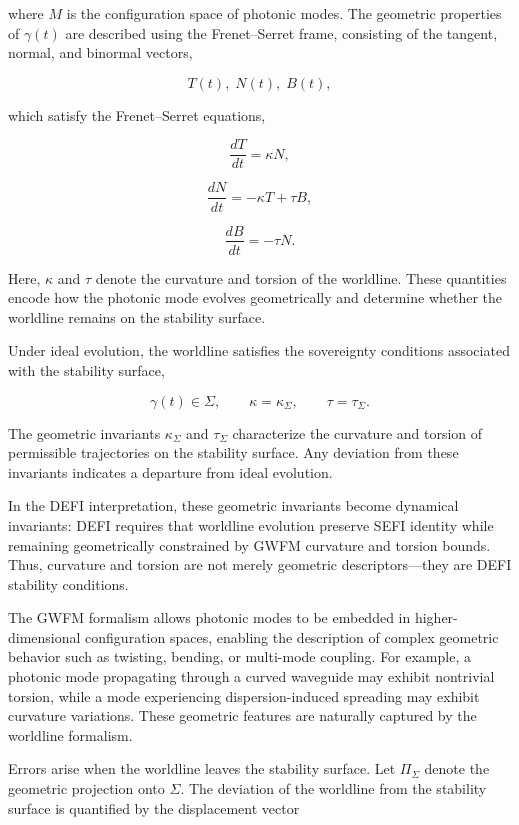 \documentclass[aip,adv,reprint,floatfix]{revtex4-2}
\begin{document}
where $M$ is the configuration space of photonic modes.
The geometric properties of $\gamma(t)$ are described using the
Frenet–Serret frame, consisting of the tangent, normal,
and binormal vectors,


\[
T(t),\; N(t),\; B(t),
\]


which satisfy the Frenet–Serret equations,\cite{DuttonElectronField2026}


\[
\frac{dT}{dt} = \kappa N,
\]




\[
\frac{dN}{dt} = -\kappa T + \tau B,
\]




\[
\frac{dB}{dt} = -\tau N.
\]


Here, $\kappa$ and $\tau$ denote the curvature and torsion of the
worldline. These quantities encode how the photonic
mode evolves geometrically and determine whether the
worldline remains on the stability surface.

Under ideal evolution, the worldline satisfies the
sovereignty conditions associated with the stability surface,


\[
\gamma(t) \in \Sigma,\qquad \kappa = \kappa_{\Sigma},\qquad \tau = \tau_{\Sigma}.
\]


The geometric invariants $\kappa_{\Sigma}$ and $\tau_{\Sigma}$ characterize the curvature and torsion of permissible trajectories on the stability surface. Any deviation from these invariants indicates a departure from ideal evolution.

In the DEFI interpretation, these geometric invariants
become dynamical invariants:\cite{DuttonSEFI2026} DEFI requires that worldline evolution preserve SEFI identity while remaining geometrically constrained by GWFM curvature and torsion
bounds. Thus, curvature and torsion are not merely geometric descriptors—they are DEFI stability conditions.

The GWFM formalism allows photonic modes to be
embedded in higher-dimensional configuration spaces,
enabling the description of complex geometric behavior
such as twisting, bending, or multi-mode coupling.\cite{DuttonElectronField2026}
For example, a photonic mode propagating through a curved
waveguide may exhibit nontrivial torsion, while a mode
experiencing dispersion-induced spreading may exhibit
curvature variations. These geometric features are naturally captured by the worldline formalism.

Errors arise when the worldline leaves the stability surface. Let $\Pi_{\Sigma}$ denote the geometric projection onto $\Sigma$.
The deviation of the worldline from the stability surface
is quantified by the displacement vector
\end{document}
